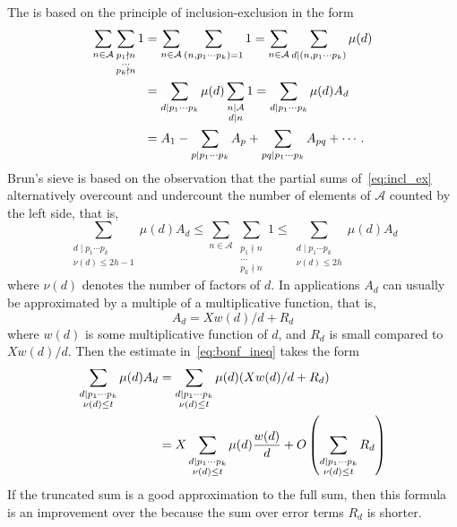 \documentclass[12pt]{article}
\begin{document}
The  is
based on the principle of inclusion-exclusion in the form
\begin{align}\notag
\sum_{n\in\mathcal{A}}\sum_{\substack{p_1\nmid n\\\dots\\p_k\nmid
n}}1&=\sum_{n\in\mathcal{A}}\sum_{(n,p_1\dotsb p_k)=1}
1=\sum_{n\in\mathcal{A}} \sum_{d\mid (n,p_1\dotsb p_k)}\mu(d)\\
\notag&=\sum_{d\mid p_1\dotsb
p_k}\mu(d)\sum_{\substack{n\mid\mathcal{A}\\d\mid n}}1=\sum_{d\mid
p_1\dotsb p_k}\mu(d)A_d\\\label{eq:incl_ex} &=A_1-\sum_{p\mid
p_1\dotsb p_k} A_p+\sum_{pq\mid p_1\dotsb p_k} A_{pq}+\dotsb.
\end{align}
Brun's sieve is based on the observation that the partial sums 
of~\eqref{eq:incl_ex} alternatively overcount and
undercount the number of elements of $\mathcal{A}$ counted by the
left side, that is,
\begin{equation}\label{eq:bonf_ineq}
\sum_{\substack{d\mid p_1\dotsb p_k\\\nu(d)\leq
2h-1}}\mu(d)A_d\leq \sum_{n\in\mathcal{A}}\sum_{\substack{p_1\nmid
n\\\dots\\p_k\nmid n}}1\leq \sum_{\substack{d\mid p_1\dotsb
p_k\\\nu(d)\leq 2h}} \mu(d)A_d
\end{equation}
where $\nu(d)$ denotes the number of  factors of $d$. In
applications $A_d$ can usually be approximated by a multiple of a
multiplicative function, that is,
\begin{equation*}
A_d=X w(d)/d+R_d
\end{equation*}
where $w(d)$ is some multiplicative function of $d$, and $R_d$ is
small compared to $X w(d)/d$. Then the estimate
in~\eqref{eq:bonf_ineq} takes the form
\begin{align}\notag
\sum_{\substack{d\mid p_1\dotsb p_k\\\nu(d)\leq t}}
\mu(d)A_d&=\sum_{\substack{d\mid p_1\dotsb p_k\\\nu(d)\leq t}}
\mu(d)(X w(d)/d+R_d)
\\\label{eq:intmd}
&=X\sum_{\substack{d\mid p_1\dotsb p_k\\\nu(d)\leq t}} \mu(d)
\frac{w(d)}{d}+O\left(\sum_{\substack{d\mid p_1\dotsb
p_k\\\nu(d)\leq t}} R_d
\right)
\end{align}
If the truncated sum is a good approximation to the full sum, then
this formula is an improvement over the 
 because the sum over error
terms $R_d$ is shorter.
\end{document}
